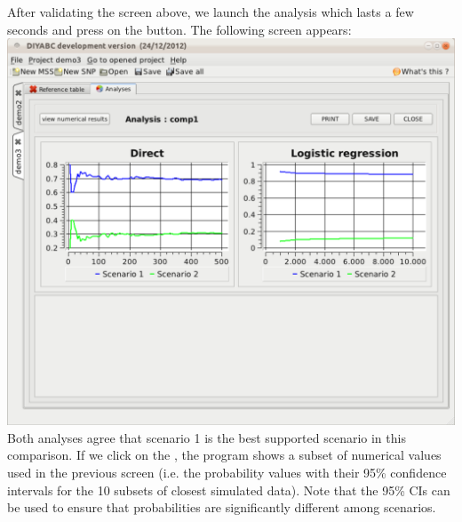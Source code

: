 After validating the screen above, we launch the analysis which lasts a few seconds and press on the  button. The following screen appears:\\

 \includegraphics[scale=0.3]{gui_pictures/Capture-DIYABC-111.png} \\

Both analyses agree that scenario 1 is the best supported scenario in this comparison. If we click on the , the program shows a subset of numerical values used in the previous screen (i.e. the probability values with their 95\% confidence intervals for the 10 subsets of closest simulated data). Note that the 95\% CIs can be used to ensure that probabilities are significantly different among scenarios.\\


